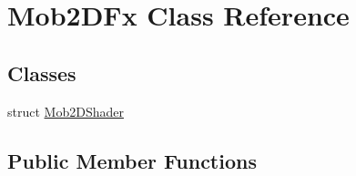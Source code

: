 \hypertarget{classMob2DFx}{
\section{Mob2DFx Class Reference}
\label{classMob2DFx}
}
\subsection*{Classes}
\begin{DoxyCompactItemize}
\item 
struct \hyperlink{structMob2DFx_1_1Mob2DShader}{Mob2DShader}
\end{DoxyCompactItemize}
\subsection*{Public Member Functions}
